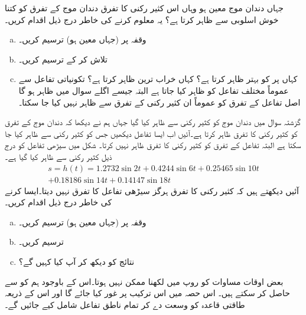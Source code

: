 جہاں دندان موج معین ہو وہاں اس کثیر رکنی کا تفرق دندان موج کے تفرق کو کتنا خوش اسلوبی سے ظاہر کرتا ہے؟ یہ معلوم کرنے کی خاطر درج ذیل اقدام کریں۔
\begin{enumerate}[a.]

\item
وقفہ  پر  (جہاں معین ہو) ترسیم کریں۔
\item
{} تلاش کر کے ترسیم کریں۔
\item
کہاں پر  کو  بہتر ظاہر کرتا ہے؟ کہاں خراب ترین ظاہر کرتا ہے؟ تکونیاتی تفاعل سے عموماً مختلف تفاعل کو ظاہر کیا جاتا ہے البتہ جیسے اگلے  سوال میں ظاہر ہو گا اصل تفاعل کے تفرق کو عموماً ان کثیر رکنی کے تفرق سے ظاہر نہیں کیا جا سکتا۔
\end{enumerate}
  گزشتہ سوال میں دندان موج کو کثیر رکنی سے ظاہر کیا گیا جہاں ہم نے دیکھا کہ دندان موج کے تفرق کو  کثیر رکنی کا تفرق ظاہر کرتا ہے۔آئیں اب ایسا تفاعل دیکھیں جس کو کثیر رکنی سے ظاہر کیا جا سکتا ہے البتہ تفاعل کے تفرق کو  کثیر رکنی کا تفرق ظاہر نہیں کرتا۔ شکل  میں سیڑھی تفاعل کو درج ذیل کثیر رکنی سے ظاہر کیا گیا ہے۔
\begin{multline*}
s=h(t)=1.2732\sin 2t+0.4244\sin 6t+0.25465\sin 10t\\
+0.18186\sin 14t+0.14147\sin 18t
\end{multline*} 
آئیں دیکھتے ہیں کہ کثیر رکنی کا تفرق ہرگز سیڑھی تفاعل کا تفرق نہیں دیتا۔ایسا کرنے کی خاطر درج ذیل اقدام کریں۔
\begin{enumerate}[a.]

\item
وقفہ  پر  (جہاں معین ہو) ترسیم کریں۔
\item
{} ترسیم کریں۔
\item
نتائج کو دیکھ کر آپ کیا کہیں گے؟
\end{enumerate}



بعض اوقات مساوات  کو  روپ میں لکھنا ممکن نہیں ہوتا۔اس کے باوجود ہم  کو  سے حاصل کر سکتے ہیں۔ اس حصہ میں اس ترکیب پر غور کیا جائے گا اور  اس کے ذریعہ طاقتی قاعدہ کو وسعت دے کر  تمام ناطق تفاعل شامل کیے جائیں گے۔

